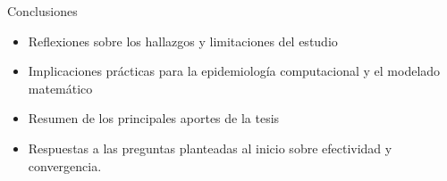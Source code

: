 \begin{conclusions}
    Conclusiones
\end{conclusions}

\label{sec:19}
    \begin{itemize}
        \item  Reflexiones sobre los hallazgos y limitaciones del estudio
        \item  Implicaciones prácticas para la epidemiología computacional y el modelado matemático
       \item  Resumen de los principales aportes de la tesis
        \item  Respuestas a las preguntas planteadas al inicio sobre efectividad y convergencia.
    \end{itemize}